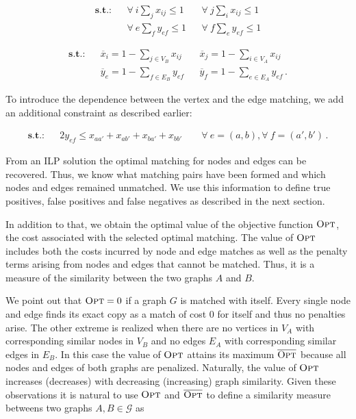 		\begin{align}
		\textbf{s.t.:} 	& &\forall \ i \sum_{j} x_{ij} \leq 1  &&\forall \ j \sum_{i} x_{ij} \leq 1 \\
						& &\forall \ e \sum_{f} y_{ef} \leq 1  &&\forall \ f \sum_{e} y_{ef} \leq 1				                               
		\end{align}

		\begin{align}
		\textbf{s.t.:} 	& &\overline{x}_{i} =  1 - \sum_{j \in V_B} x_{ij} &&\overline{x}_{j} =  1 - \sum_{i \in V_A} x_{ij} \\          
						& &\overline{y}_{e} =  1 - \sum_{f \in E_B} y_{ef} &&\overline{y}_{f} =  1 - \sum_{e \in E_A} y_{ef} \, .                                        
		\end{align}

		To introduce the dependence between the vertex and the edge matching, we add an additional constraint as described earlier: 

		\begin{align}
			\textbf{s.t.:} 	& &2y_{ef} \leq x_{aa'} + x_{ab'} + x_{ba'} + x_{bb'}     \quad \quad \forall \ e = (a,b), \forall \ f = (a',b')\,.      
		\end{align}

		From an ILP solution the optimal matching for nodes and edges can be recovered. Thus, we know what matching pairs have been formed and which nodes and edges remained unmatched. We use this information to define true positives, false positives and false negatives as described in the next section. 

		In addition to that, we obtain the optimal value of the objective function $\textsc{Opt}$, \ie the cost associated with the selected optimal matching. The value of $\textsc{Opt}$ includes both the costs incurred by node and edge matches as well as the penalty terms arising from nodes and edges that cannot be matched. Thus, it is a measure of the similarity between the two graphs $A$ and $B$.

		We point out that $\textsc{Opt} = 0$ if a graph $G$ is matched with itself. Every single node and edge finds its exact copy as a match of cost $0$ for itself and thus no penalties arise. The other extreme is realized when there are no vertices in $V_A$ with corresponding similar nodes in $V_B$ and no edges $E_A$ with corresponding similar edges in $E_B$. In this case the value of $\textsc{Opt}$ attains its maximum $\overline{\textsc{Opt}}$ because all nodes and edges of both graphs are penalized. Naturally, the value of $\textsc{Opt}$ increases (decreases) with decreasing (increasing) graph similarity. Given these observations it is natural to use $\textsc{Opt}$ and $\overline{\textsc{Opt}}$ to define a similarity measure betweens two graphs $A, B \in \mathcal{G}$ as


